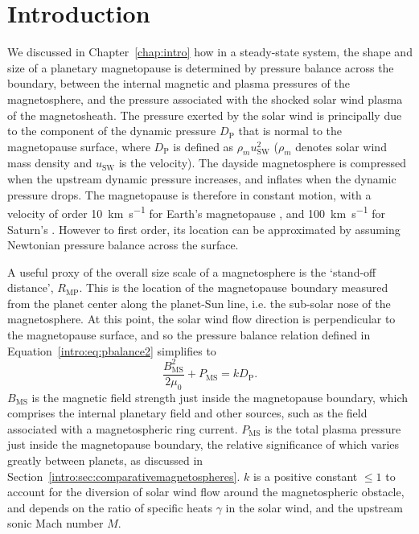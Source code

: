 \section{Introduction}\label{compress:sec:intro}
We discussed in Chapter~\ref{chap:intro} how in a steady-state system, the shape and size of a planetary magnetopause is determined by pressure balance across the boundary, between the internal magnetic and plasma pressures of the magnetosphere, and the pressure associated with the shocked solar wind plasma of the magnetosheath. The pressure exerted by the solar wind is principally due to the component of the dynamic pressure $D_\mathrm{P}$ that is normal to the magnetopause surface, where $D_\mathrm{P}$ is defined as $\rho_mu_\mathrm{SW}^2$ ($\rho_m$ denotes solar wind mass density and $u_\mathrm{SW}$ is the velocity). The dayside magnetosphere is compressed when the upstream dynamic pressure increases, and inflates when the dynamic pressure drops. The magnetopause is therefore in constant motion, with a velocity of order {\SI{10}{km s^{-1}}} for Earth's magnetopause {\citep{berchem1982}}, and {\SI{100}{km s^{-1}}} for Saturn's {\citep{masters2011}}. However to first order, its location can be approximated by assuming Newtonian pressure balance across the surface. 

A useful proxy of the overall size scale of a magnetosphere is the `stand-off distance', $R_\mathrm{MP}$. This is the location of the magnetopause boundary measured from the planet center along the planet-Sun line, i.e. the sub-solar nose of the magnetosphere. At this point, the solar wind flow direction is perpendicular to the magnetopause surface, and so the pressure balance relation defined in Equation~\ref{intro:eq:pbalance2} simplifies to
\begin{equation}\label{compress:eq:pbalance}
\frac{B_{\mathrm{MS}}^2}{2\mu_0} + P_{\mathrm{MS}} = kD_\mathrm{P}.
\end{equation}
$B_\mathrm{MS}$ is the magnetic field strength just inside the magnetopause boundary, which comprises the internal planetary field and other sources, such as the field associated with a magnetospheric ring current. $P_{\mathrm{MS}}$ is the total plasma pressure just inside the magnetopause boundary, the relative significance of which varies greatly between planets, as discussed in Section~\ref{intro:sec:comparativemagnetospheres}. $k$ is a positive constant $\leq1$ to account for the diversion of solar wind flow around the magnetospheric obstacle, and depends on the ratio of specific heats $\gamma$ in the solar wind, and the upstream sonic Mach number $M$. 

